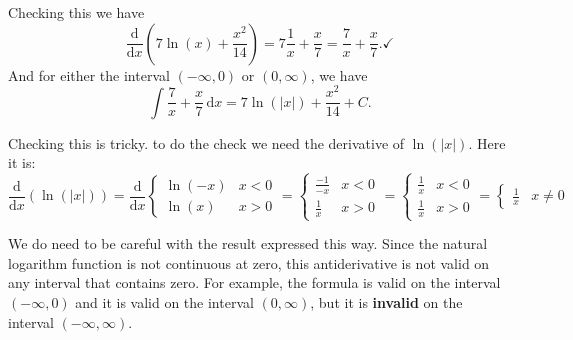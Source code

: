 \documentclass[12pt,fleqn,answers]{exam}
\begin{document}
\begin{questions}
\begin{parts}
\begin{solution}[1.5in]
     Checking this we have
     \begin{equation*}
      \frac{\mathrm{d}}{\mathrm{d} x} \left( 7 \ln(x) + \frac{x^2}{14} \right)
       = 7 \frac{1}{x} + \frac{x}{7}
       = \frac{7}{x} + \frac{x}{7} . \checkmark
     \end{equation*}
     And for either the interval $(-\infty,0)$ or $(0,\infty)$, we have
      \begin{equation*}
    \int \frac{7}{x} + \frac{x}{7} \, \mathrm{d} x = 7 \ln(|x|) + \frac{x^2}{14} + C.
     \end{equation*}

     Checking this is tricky. to do the check we need
     the derivative of $\ln(|x|)$. Here it is:
     \begin{equation*}
      \frac{\mathrm{d}}{\mathrm{d} x} \left(\ln(|x|) \right)
     =  \frac{\mathrm{d}}{\mathrm{d} x}  \begin{cases}
        \ln(-x) & x < 0 \\
        \ln(x)  & x > 0 
     \end{cases}
     = 
     \begin{cases}
      \frac{-1}{-x} & x < 0 \\
      \frac{1}{x}  & x > 0 
    \end{cases}
    =
    \begin{cases}
      \frac{1}{x} & x < 0 \\
      \frac{1}{x}  & x > 0 
    \end{cases}
    = 
    \begin{cases}
      \frac{1}{x} & x \neq 0 
    \end{cases}
     \end{equation*}


     We do need to be careful with the result expressed this way.
     Since the natural logarithm function is not continuous at 
     zero, this antiderivative is not valid on any interval
     that contains zero. For example, the formula is valid
     on the interval $(-\infty,0)$ and it is valid on
     the interval $(0,\infty)$, but it is \textbf{invalid} 
     on the interval $(-\infty, \infty)$.
    \end{solution}


\end{parts}
\end{questions}
\end{document}
